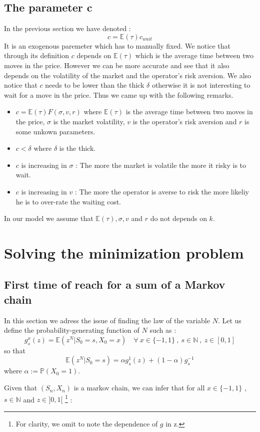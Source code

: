 \documentclass{article}
\begin{document}
\subsection{The parameter c}
In the previous section we have denoted :
$$
	c = \mathbb{E}(\tau) c_{wait}
$$
It is an exogenous paremeter which has to manually fixed. We notice that through its definition $c$ depends on $\mathbb{E}(\tau)$ which is the average time between two moves in the price. However we can be more accurate and see that it also depends on the volatility of the market and the operator's risk aversion. We also notice that $c$ needs to be lower than the thick $\delta$ otherwise it is not interesting to wait for a move in the price.
Thus we came up with the following remarks.
\begin{itemize}
\item $c = \mathbb{E}(\tau) F(\sigma,v,r)$ where $ \mathbb{E}(\tau)$ is the average time between two moves in the price, $\sigma$ is the market volatility, $v$ is the operator's risk aversion and $r$ is some unkown parameters. 
\item $c<\delta$ where $\delta$ is the thick.
\item $c$ is increasing in $\sigma$ : The more the market is volatile the more it risky is to wait.
\item $c$ is increasing in $v$ : The more the operator is averse to risk the more likeliy he is to over-rate the waiting cost. 
\end{itemize}
In our model we assume that $\mathbb{E}(\tau) , \sigma, v
$ and $r$ do not depends on $k$.

\newpage
\section{Solving the minimization problem}
\subsection{First time of reach for a sum of a Markov chain}
In this section we adress the issue of finding the law of the variable $N$. Let us define the  probability-generating function of $N$ such as :
$$ g_{s}^{x}(z) = \mathbb{E}(z^{N} | S_0=s, X_0=x) \quad \forall \ x \in \{-1,1\} \ , \ s \in \mathbb{N} \ , \ z \in [0,1]  $$
so that
$$\mathbb{E}(z^{N} | S_0=s) = \alpha  g_{s}^{1}(z) + (1-\alpha) g_{s}^{-1} $$
where $\alpha := \mathbb{P}(X_0 = 1)$.

Given that $(S_n, X_n)$ is a markov chain, we can infer that for all $x \in \{-1,1\}$ , $s \in \mathbb{N}$ and $z \in ]0,1[$ \footnote{For clarity, we omit to note the dependence of $g$ in z.} :
\end{document}
